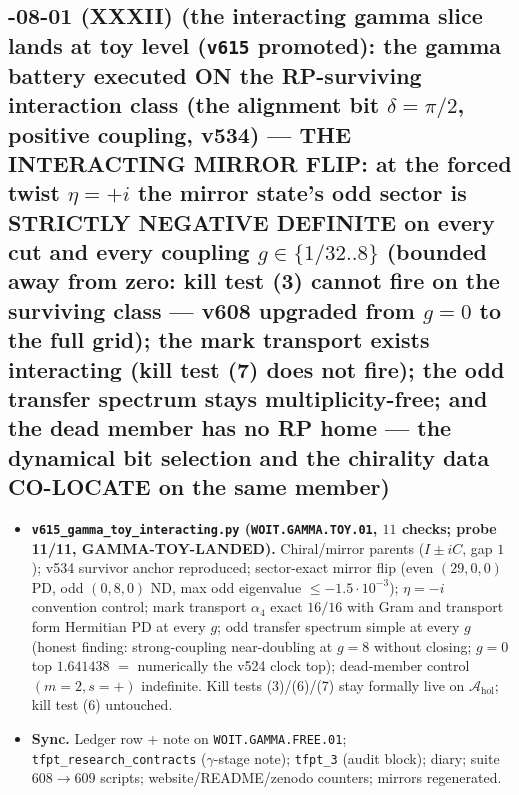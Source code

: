 \documentclass[11pt]{article}
\begin{document}
\subsection*{-08-01 (XXXII) (the interacting gamma slice lands at toy level (\texttt{v615} promoted): the gamma battery executed ON the RP-surviving interaction class (the alignment bit $\delta=\pi/2$, positive coupling, v534) --- THE INTERACTING MIRROR FLIP: at the forced twist $\eta=+i$ the mirror state's odd sector is STRICTLY NEGATIVE DEFINITE on every cut and every coupling $g\in\{1/32..8\}$ (bounded away from zero: kill test (3) cannot fire on the surviving class --- v608 upgraded from $g=0$ to the full grid); the mark transport exists interacting (kill test (7) does not fire); the odd transfer spectrum stays multiplicity-free; and the dead member has no RP home --- the dynamical bit selection and the chirality data CO-LOCATE on the same member)}
\begin{itemize}[leftmargin=1.5em]
\item \textbf{\texttt{v615\_gamma\_toy\_interacting.py} (\texttt{WOIT.GAMMA.TOY.01}, $11$ checks;
probe 11/11, GAMMA-TOY-LANDED).} Chiral/mirror parents ($I\pm iC$, gap $1$); v534 survivor
anchor reproduced; sector-exact mirror flip (even $(29,0,0)$ PD, odd $(0,8,0)$ ND, max odd
eigenvalue $\le-1.5\cdot10^{-3}$); $\eta=-i$ convention control; mark transport
$\alpha_4$ exact $16/16$ with Gram and transport form Hermitian PD at every $g$;
odd transfer spectrum simple at every $g$ (honest finding: strong-coupling near-doubling
at $g=8$ without closing; $g=0$ top $1.641438$ $=$ numerically the v524 clock top);
dead-member control $(m{=}2,s{=}+)$ indefinite.  Kill tests (3)/(6)/(7) stay formally
live on $\mathcal A_{\mathrm{hol}}$; kill test (6) untouched.
\item \textbf{Sync.} Ledger row + note on \texttt{WOIT.GAMMA.FREE.01};
\texttt{tfpt\_research\_contracts} ($\gamma$-stage note); \texttt{tfpt\_3} (audit block);
diary; suite $608\to609$ scripts; website/README/zenodo counters; mirrors regenerated.
\end{itemize}
\end{document}
